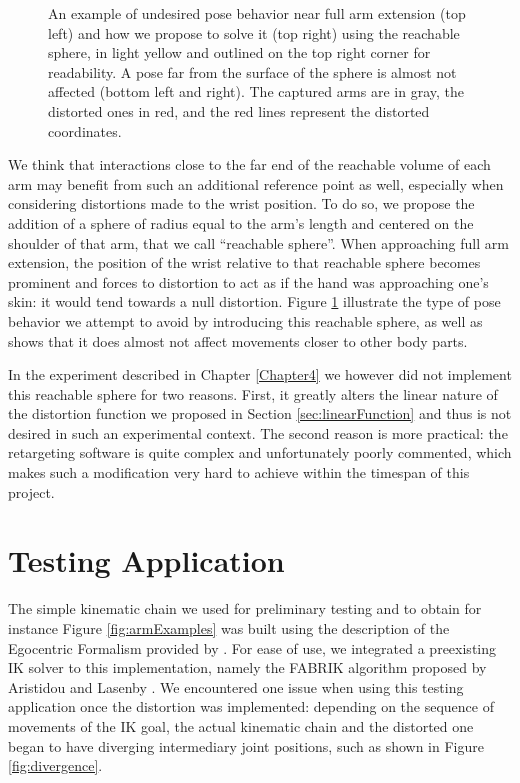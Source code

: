 \begin{figure}[h]
    \caption{An example of undesired pose behavior near full arm extension (top left) and how we propose to solve it (top right) using the reachable sphere, in light yellow and outlined on the top right corner for readability. A pose far from the surface of the sphere is almost not affected (bottom left and right). The captured arms are in gray, the distorted ones in red, and the red lines represent the distorted coordinates.}
    \label{fig:reachableSphere}
\end{figure}

We think that interactions close to the far end of the reachable volume of each arm may benefit from such an additional reference point as well, especially when considering distortions made to the wrist position. To do so, we propose the addition of a sphere of radius equal to the arm's length and centered on the shoulder of that arm, that we call ``reachable sphere''. When approaching full arm extension, the position of the wrist relative to that reachable sphere becomes prominent and forces to distortion to act as if the hand was approaching one's skin: it would tend towards a null distortion. Figure \ref{fig:reachableSphere} illustrate the type of pose behavior we attempt to avoid by introducing this reachable sphere, as well as shows that it does almost not affect movements closer to other body parts.

In the experiment described in Chapter \ref{Chapter4} we however did not implement this reachable sphere for two reasons. First, it greatly alters the linear nature of the distortion function we proposed in Section \ref{sec:linearFunction} and thus is not desired in such an experimental context. The second reason is more practical: the retargeting software is quite complex and unfortunately poorly commented, which makes such a modification very hard to achieve within the timespan of this project.

\section{Testing Application}
\label{sec:testingApp}
The simple kinematic chain we used for preliminary testing and to obtain for instance Figure \ref{fig:armExamples} was built using the description of the Egocentric Formalism provided by \cite{molla2016precise}. For ease of use, we integrated a preexisting IK solver to this implementation, namely the FABRIK algorithm proposed by Aristidou and Lasenby \cite{aristidou2011fabrik}. We encountered one issue when using this testing application once the distortion was implemented: depending on the sequence of movements of the IK goal, the actual kinematic chain and the distorted one began to have diverging intermediary joint positions, such as shown in Figure \ref{fig:divergence}.

